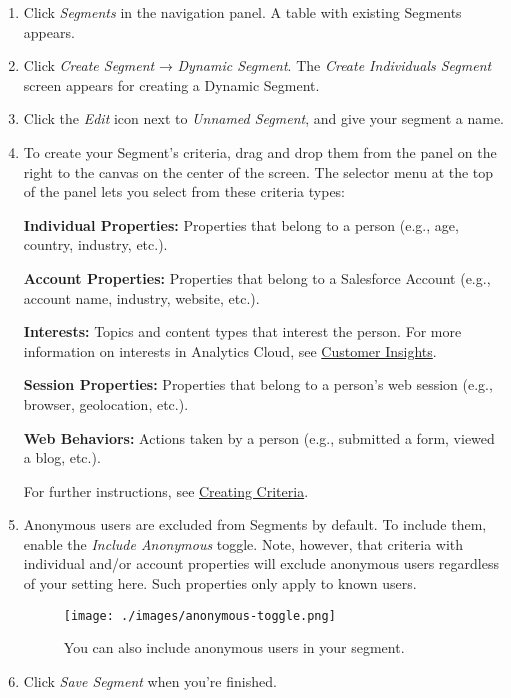\begin{enumerate}
\def\labelenumi{\arabic{enumi}.}
\item
  Click \emph{Segments} in the navigation panel. A table with existing
  Segments appears.
\item
  Click \emph{Create Segment} → \emph{Dynamic Segment}. The \emph{Create
  Individuals Segment} screen appears for creating a Dynamic Segment.
\item
  Click the \emph{Edit} icon next to \emph{Unnamed Segment}, and give
  your segment a name.
\item
  To create your Segment's criteria, drag and drop them from the panel
  on the right to the canvas on the center of the screen. The selector
  menu at the top of the panel lets you select from these criteria
  types:

  \textbf{Individual Properties:} Properties that belong to a person
  (e.g., age, country, industry, etc.).

  \textbf{Account Properties:} Properties that belong to a Salesforce
  Account (e.g., account name, industry, website, etc.).

  \textbf{Interests:} Topics and content types that interest the person.
  For more information on interests in Analytics Cloud, see
  \href{https://help.liferay.com/hc/en-us/articles/360006947951-Customer-Insights}{Customer
  Insights}.

  \textbf{Session Properties:} Properties that belong to a person's web
  session (e.g., browser, geolocation, etc.).

  \textbf{Web Behaviors:} Actions taken by a person (e.g., submitted a
  form, viewed a blog, etc.).

  For further instructions, see \hyperref[creating-criteria]{Creating
  Criteria}.
\item
  Anonymous users are excluded from Segments by default. To include
  them, enable the \emph{Include Anonymous} toggle. Note, however, that
  criteria with individual and/or account properties will exclude
  anonymous users regardless of your setting here. Such properties only
  apply to known users.

  \begin{figure}
  \centering
  \texttt{[image: ./images/anonymous-toggle.png]}
  \caption{You can also include anonymous users in your segment.}
  \end{figure}
\item
  Click \emph{Save Segment} when you're finished.
\end{enumerate}

